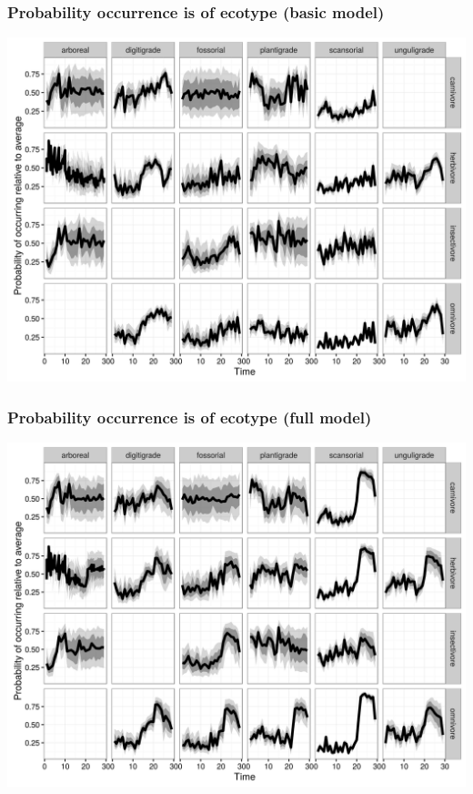 \documentclass{beamer}
\begin{document}
\begin{frame}
  \frametitle{Probability occurrence is of ecotype (basic model)}

  \begin{center}
    \includegraphics[height=0.8\textheight,width=\textwidth,keepaspectratio=true]{figure/cept_occur_prob_basic}
  \end{center}
\end{frame}

\begin{frame}
  \frametitle{Probability occurrence is of ecotype (full model)}

  \begin{center}
    \includegraphics[height=0.8\textheight,width=\textwidth,keepaspectratio=true]{figure/cept_occur_prob_full}
  \end{center}
\end{frame}
\end{document}
